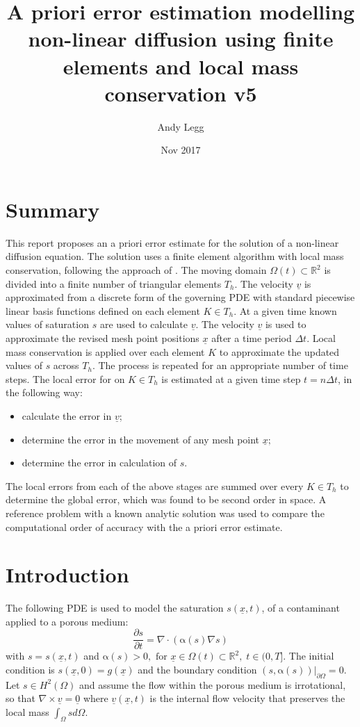 \documentclass[11pt]{article}
\title{A priori error estimation modelling non-linear diffusion using finite elements and local mass conservation v5}
\author{Andy Legg}
\date{Nov 2017}
\newcommand{\pl}{\partial}
\newcommand{\D}{\Delta}
\newcommand{\ul}{\underline}
\newcommand{\Om}{\Omega}
\newcommand{\al}{\mathrm{\alpha}}
\begin{document}
\maketitle
\section{Summary}
This report proposes an a priori error estimate for the solution of a non-linear diffusion equation. The solution uses a finite element algorithm with local mass conservation, following the  approach of \cite{Baines2011}. The moving domain $\Om(t)\subset\mathbb{R}^2$ is divided into a finite number of triangular elements $T_h$.  The velocity $\ul{v}$ is approximated from a discrete form of the governing PDE with standard piecewise linear basis functions defined on each element $K\in T_h$. At a given time known values of saturation $s$ are used to calculate $\ul{v}$. The velocity $\ul{v}$ is used to approximate the revised mesh point positions $\ul{x}$ after a time period $\D{t}$. Local mass conservation is applied over each element $K$ to approximate the updated values of $s$ across  $T_h$. The process is repeated for an appropriate number of time steps. The local error for on $K \in T_h$ is estimated at a given time step $t=n\D{t}$, in the following way:
\begin{itemize}
\item calculate the error in $\ul{v}$;
\item determine the error in the movement of any mesh point $\ul{x};$
\item determine the error in calculation of $s$.
\end{itemize}
The local errors from each of the above stages are summed over every $K \in T_h$ to determine the global error, which was found to be second order in space. A reference problem with a known analytic solution was used to compare the computational order of accuracy with the a priori error estimate. 
\section{Introduction}
The following PDE is used to model the saturation $s(\underline{x},t)$, of a contaminant applied to a porous medium: 
\begin{equation}
\label{eq:pde}
\frac{\partial{s}}{\partial{t}} = \nabla\cdot\left(\al(s)\nabla{s}\right) 
\end{equation}
with $s =s(\ul{x},t)$ and $\al(s) >0, \text{ for } \underline{x} \in \Omega{(t)}\subset\mathbb{R}^2, \;t\in(0,T]$. The initial condition is $s(\ul{x},0) = g(\ul{x})$ and the boundary condition $(s,\al{(s)})|_{\pl\Om}=0$.  Let $s \in H^{2}(\Omega)$ and assume the flow within the porous medium is irrotational, so that $\nabla\times\underline{v} = \underline{0}$ where $\underline{v}(\ul{x},t)$ is the internal flow velocity that preserves the local mass $\int_{\Om}sd\Om.$ \\
\end{document}
